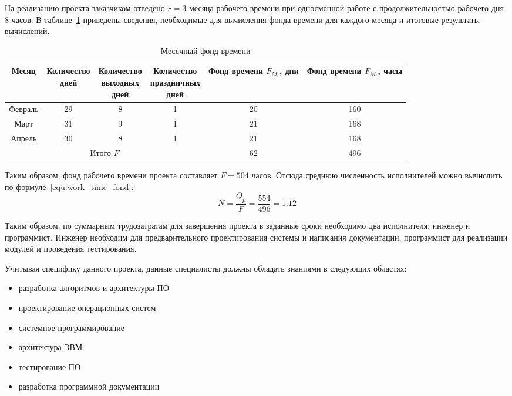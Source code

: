 На реализацию проекта заказчиком отведено $r = 3$ месяца рабочего времени при
односменной работе с продолжительностью рабочего дня 8 часов. В таблице~\ref{tab:month_time_fond}
приведены сведения, необходимые для вычисления фонда времени для каждого
месяца и итоговые результаты вычислений.

\begin{table}[ht!]
  \centering
  \caption{Месячный фонд времени}
  \label{tab:month_time_fond}
  \begin{tabular}{|c|c|c|c|c|c|}
    \hline
	Месяц & \thead{Количество \\ дней} & \thead{Количество \\ выходных \\ дней} &
		\thead{Количество \\ праздничных \\ дней} & \thead{Фонд \\ времени \\ $F_{M_{i}}$, дни} &
		\thead{Фонд \\ времени \\ $F_{M_{i}}$, часы} \\
    \hline
	Февраль & 29 & 8 & 1 & 20 & 160 \\
    \hline
	Март & 31 & 9 & 1 & 21 & 168 \\
    \hline
	Апрель & 30 & 8 & 1 & 21 & 168 \\
    \hline
	\multicolumn{4}{|c|}{Итого $F$} & 62 & 496 \\
    \hline
  \end{tabular}
\end{table}

Таким образом, фонд рабочего времени проекта составляет $F = 504$ часов.
Отсюда среднюю численность исполнителей можно вычислить по формуле~\ref{equ:work_time_fond}:
\begin{equation}
	N = \frac{Q_{p}}{F} = \frac{554}{496} = 1.12
\label{equ:work_time_fond}
\end{equation}

Таким образом, по суммарным трудозатратам для завершения проекта в заданные
сроки необходимо два исполнителя: инженер и программист. Инженер необходим для
предварительного проектирования системы и написания документации, программист
для реализации модулей и проведения тестирования.

Учитывая специфику данного проекта, данные специалисты должны обладать
знаниями в следующих областях:
\begin{itemize}
\item разработка алгоритмов и архитектуры ПО
\item проектирование операционных систем
\item системное программирование
\item архитектура ЭВМ
\item тестирование ПО
\item разработка программной документации
\end{itemize}

